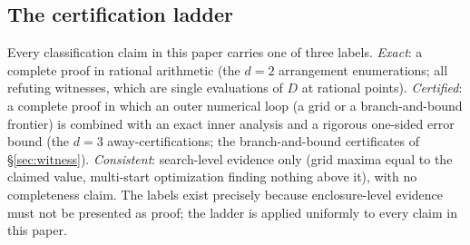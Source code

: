 \subsection{The certification ladder}

Every classification claim in this paper carries one of three labels.
\emph{Exact}: a complete proof in rational arithmetic (the $d=2$
arrangement enumerations; all refuting witnesses, which are single
evaluations of $D$ at rational points). \emph{Certified}: a complete
proof in which an outer numerical loop (a grid or a branch-and-bound
frontier) is combined with an exact inner analysis and a rigorous
one-sided error bound (the $d=3$ away-certifications; the
branch-and-bound certificates of \S\ref{sec:witness}). \emph{Consistent}:
search-level evidence only (grid maxima equal to the claimed value,
multi-start optimization finding nothing above it), with no completeness
claim. The labels exist precisely because enclosure-level evidence must
not be presented as proof; the ladder is applied uniformly to every
claim in this paper.
